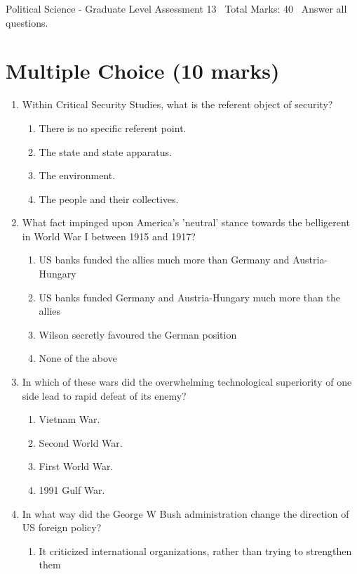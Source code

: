 \documentclass[12pt]{article}
\begin{document}
\begin{center}
Political Science - Graduate Level Assessment 13 \
Total Marks: 40 \
Answer all questions.
\end{center}

\section*{Multiple Choice (10 marks)}
\begin{enumerate}[label=\arabic*.]
\item Within Critical Security Studies, what is the referent object of security?
\begin{enumerate}[label=(\alph*)]
    \item There is no specific referent point.
    \item The state and state apparatus.
    \item The environment.
    \item The people and their collectives.
\end{enumerate}
\item What fact impinged upon America's 'neutral' stance towards the belligerent in World War I between 1915 and 1917?
\begin{enumerate}[label=(\alph*)]
    \item US banks funded the allies much more than Germany and Austria-Hungary
    \item US banks funded Germany and Austria-Hungary much more than the allies
    \item Wilson secretly favoured the German position
    \item None of the above
\end{enumerate}
\item In which of these wars did the overwhelming technological superiority of one side lead to rapid defeat of its enemy?
\begin{enumerate}[label=(\alph*)]
    \item Vietnam War.
    \item Second World War.
    \item First World War.
    \item 1991 Gulf War.
\end{enumerate}
\item In what way did the George W Bush administration change the direction of US foreign policy?
\begin{enumerate}[label=(\alph*)]
    \item It criticized international organizations, rather than trying to strengthen them

\end{enumerate}
\end{enumerate}
\end{document}
